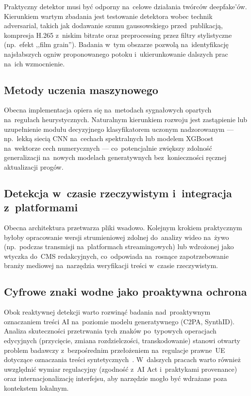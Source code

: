 Praktyczny detektor musi by\'{c} odporny na~celowe dzia\l{}ania tw\'{o}rc\'{o}w deepfake'\'{o}w.
Kierunkiem wartym zbadania jest testowanie detektora wobec technik adversarial,
takich jak dodawanie szumu gaussowskiego przed~publikacj\k{a}, kompresja
H.265 z~niskim bitrate oraz preprocessing przez filtry stylistyczne
(np.\ efekt ,,film grain'').
Badania w~tym obszarze pozwol\k{a} na~identyfikacj\k{e} najs\l{}abszych ogniw
proponowanego potoku i~ukierunkowanie dalszych prac na~ich wzmocnienie.

\subsection{Metody uczenia maszynowego}

Obecna implementacja opiera si\k{e} na~metodach sygna\l{}owych opartych na~regu\l{}ach
heurystycznych. Naturalnym kierunkiem rozwoju jest zast\k{a}pienie lub uzupe\l{}nienie
modu\l{}u decyzyjnego klasyfikatorem uczonym nadzorowanym ---
np.\ lekk\k{a} sieci\k{a} CNN na~cechach spektralnych lub modelem XGBoost
na~wektorze cech numerycznych --- co~potencjalnie zwi\k{e}kszy zdolno\'{s}\'{c}
generalizacji na~nowych modelach generatywnych bez~konieczno\'{s}ci r\k{e}cznej
aktualizacji prog\'{o}w.

\subsection{Detekcja w~czasie rzeczywistym i~integracja z~platformami}

Obecna architektura przetwarza pliki wsadowo. Kolejnym krokiem praktycznym
by\l{}oby opracowanie wersji strumieniowej zdolnej do~analizy wideo na~\.{z}ywo
(np.\ podczas transmisji na~platformach streamingowych) lub wdro\.{z}onej jako
wtyczka do~CMS redakcyjnych, co~odpowiada na~rosn\k{a}ce zapotrzebowanie
bran\.{z}y mediowej na~narz\k{e}dzia weryfikacji tre\'{s}ci w~czasie rzeczywistym.

\subsection{Cyfrowe znaki wodne jako proaktywna ochrona}

Obok reaktywnej detekcji warto rozwin\k{a}\'{c} badania nad~proaktywnym
oznaczaniem tre\'{s}ci AI na~poziomie modelu generatywnego (C2PA, SynthID).
Analiza skuteczno\'{s}ci przetrwania tych znak\'{o}w po~typowych operacjach edycyjnych
(przyci\k{e}cie, zmiana rozdzielczo\'{s}ci, transkodowanie) stanowi otwarty
problem badawczy z~bezpo\'{s}rednim prze\l{}o\.{z}eniem na~regulacje prawne~UE
dotycz\k{a}ce oznaczania tre\'{s}ci syntetycznych~\cite{EUAIAct2024}.
W~dalszych pracach warto równie\.z{} uwzgl\k{e}dni\'{c} wymiar regulacyjny
(zgodno\'{s}\'{c} z~AI Act i~praktykami provenance) oraz internacjonalizacj\k{e}
interfejsu, aby narz\k{e}dzie mog\l{}o by\'{c} wdra\.{z}ane poza kontekstem lokalnym.
